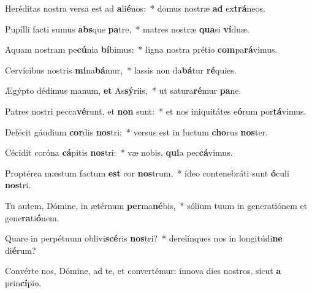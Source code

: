 \item Heréditas nostra versa est ad \textbf{a}li\textbf{é}nos:~* domus nostræ \textbf{ad} ex\textbf{trá}neos.
\item Pupílli facti sumus \textbf{abs}que \textbf{pa}tre,~* matres nostræ \textbf{qua}si \textbf{ví}duæ.
\item Aquam nostram pe\textbf{cú}nia \textbf{bí}bimus:~* ligna nostra prétio \textbf{com}pa\textbf{rá}vimus.
\item Cervícibus nostris \textbf{mi}na\textbf{bá}mur,~* lassis non da\textbf{bá}tur \textbf{ré}quies.
\item Ægýpto dédimus manum, \textbf{et} As\textbf{sý}riis,~* ut satura\textbf{ré}mur \textbf{pa}ne.
\item Patres nostri pecca\textbf{vé}runt, et \textbf{non} sunt:~* et nos iniquitátes e\textbf{ó}rum por\textbf{tá}vimus.
\item Defécit gáudium \textbf{cor}dis \textbf{nos}tri:~* versus est in luctum \textbf{cho}rus \textbf{nos}ter.
\item Cécidit coróna \textbf{cá}pitis \textbf{nos}tri:~* væ nobis, \textbf{qui}a pec\textbf{cá}vimus.
\item Proptérea mæstum factum \textbf{est} cor \textbf{nos}trum,~* ídeo contenebráti sunt \textbf{ó}culi \textbf{nos}tri.
\item Tu autem, Dómine, in ætérnum \textbf{per}ma\textbf{né}bis,~* sólium tuum in generatiónem et gene\textbf{ra}ti\textbf{ó}nem.
\item Quare in perpétuum oblivi\textbf{scé}ris \textbf{nos}tri?~* derelínques nos in longitúdi\textbf{ne} di\textbf{é}rum?
\item Convérte nos, Dómine, ad te, et convertémur: ínnova dies nostros, sicut \textbf{a} prin\textbf{cí}pio.

